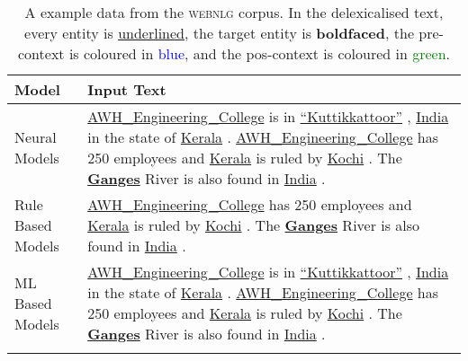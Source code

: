 \begin{table*}[t]
\centering
\begin{tabular}{lp{13cm}}
\lsptoprule
Model & Input Text \\ \midrule
Neural Models & \underline{AWH\_Engineering\_College} is in \underline{``Kuttikkattoor''} , \underline{India} in the state of \underline{Kerala} . \underline{AWH\_Engineering\_College} has 250 employees and \underline{Kerala} is ruled by \underline{Kochi} . The \textbf{\underline{Ganges}} River is also found in \underline{India} . \\
\midrule
Rule Based Models & \underline{AWH\_Engineering\_College} has 250 employees and \underline{Kerala} is ruled by \underline{Kochi} . The \textbf{\underline{Ganges}} River is also found in \underline{India} . \\ \midrule
ML Based Models & \underline{AWH\_Engineering\_College} is in \underline{``Kuttikkattoor''} , \underline{India} in the state of \underline{Kerala} . \underline{AWH\_Engineering\_College} has 250 employees and \underline{Kerala} is ruled by \underline{Kochi} . The \textbf{\underline{Ganges}} River is also found in \underline{India} . \\
\lspbottomrule
\end{tabular}
\caption{A example data from the \textsc{webnlg} corpus. In the delexicalised text, every entity is \underline{underlined}, the target entity is \textbf{boldfaced}, the pre-context is coloured in \textcolor{blue}{blue}, and the pos-context is coloured in \textcolor{green}{green}.}
\label{tab:sample}
\end{table*}
